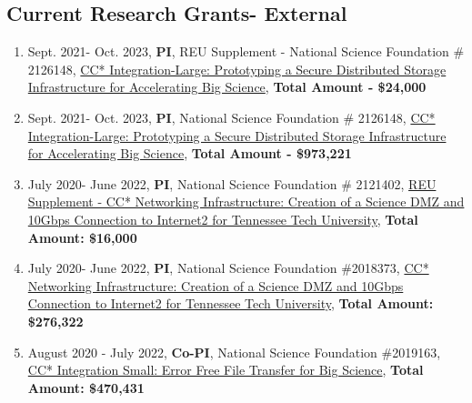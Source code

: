 \subsection{Current Research Grants- External}
\begin{enumerate}

\item Sept. 2021- Oct. 2023, \textbf{PI}, REU Supplement - National Science Foundation \# 2126148, \href{https://www.nsf.gov/awardsearch/showAward?AWD_ID=2126148}{CC* Integration-Large: Prototyping a Secure Distributed Storage Infrastructure for Accelerating Big Science},  \textbf{Total Amount - \$24,000}

\item Sept. 2021- Oct. 2023, \textbf{PI}, National Science Foundation \# 2126148, \href{https://www.nsf.gov/awardsearch/showAward?AWD_ID=2126148}{CC* Integration-Large: Prototyping a Secure Distributed Storage Infrastructure for Accelerating Big Science}, \textbf{ Total Amount - \$973,221}



\item July 2020- June 2022, \textbf{PI}, National Science Foundation \# 2121402, \href{https://www.nsf.gov/awardsearch/showAward?AWD_ID=2121402}{REU Supplement - CC* Networking Infrastructure: Creation of a Science DMZ and 10Gbps Connection to Internet2 for Tennessee Tech University}, \textbf{Total Amount: \$16,000}


\item July 2020- June 2022, \textbf{PI}, National Science Foundation \#2018373, \href{https://www.nsf.gov/awardsearch/showAward?AWD_ID=2018373}{CC* Networking Infrastructure: Creation of a Science DMZ and 10Gbps Connection to Internet2 for Tennessee Tech University}, \textbf{Total Amount: \$276,322}



\item August 2020 - July 2022, \textbf{Co-PI}, National Science Foundation \#2019163, \href{https://www.nsf.gov/awardsearch/showAward?AWD_ID=2019163}{CC* Integration Small: Error Free File Transfer for Big Science}, \textbf{Total Amount: \$470,431}


\end{enumerate}
